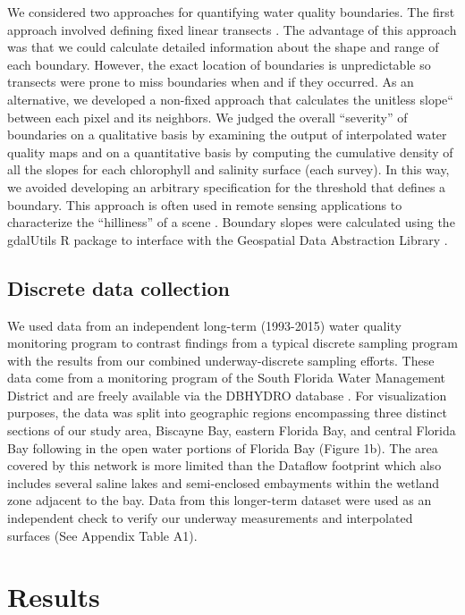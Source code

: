 \documentclass[review]{elsarticle}
\begin{document}
We considered two approaches for quantifying water quality boundaries. The first approach involved defining fixed linear transects \citep{dale2014spatial}. The advantage of this approach was that we could calculate detailed information about the shape and range of each boundary. However, the exact location of boundaries is unpredictable so transects were prone to miss boundaries when and if they occurred. As an alternative, we developed a non-fixed approach that calculates the unitless slope“ between each pixel and its neighbors. We judged the overall “severity” of boundaries on a qualitative basis by examining the output of interpolated water quality maps and on a quantitative basis by computing the cumulative density of all the slopes for each chlorophyll and salinity surface (each survey). In this way, we avoided developing an arbitrary specification for the threshold that defines a boundary. This approach is often used in remote sensing applications to characterize the “hilliness” of a scene \citep{jordan2003morphometric}. Boundary slopes were calculated using the gdalUtils R package to interface with the Geospatial Data Abstraction Library \citep{gdalutils, GDAL2017}.

\subsection{Discrete data collection}

We used data from an independent long-term (1993-2015) water quality monitoring program to contrast findings from a typical discrete sampling program with the results from our combined underway-discrete sampling efforts. These data come from a monitoring program of the South Florida Water Management District and are freely available via the DBHYDRO database . For visualization purposes, the data was split into geographic regions encompassing three distinct sections of our study area, Biscayne Bay, eastern Florida Bay, and central Florida Bay following \citet{boyer_seasonal_1999} in the open water portions of Florida Bay (Figure 1b). The area covered by this network is more limited than the Dataflow footprint which also includes several saline lakes and semi-enclosed embayments within the wetland zone adjacent to the bay. Data from this longer-term dataset were used as an independent check to verify our underway measurements and interpolated surfaces (See Appendix Table A1).

\section{Results}
\end{document}
